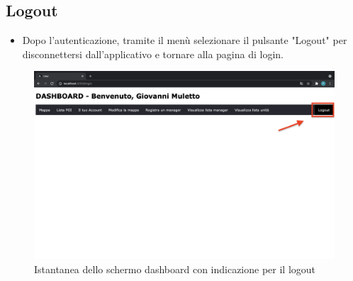 \subsection{Logout}
\begin{itemize}
    \item Dopo l'autenticazione, tramite il menù selezionare il pulsante "Logout" per disconnettersi dall'applicativo e tornare alla pagina di login.
    
\end{itemize}
\begin{figure}[H]
    \centering
    \includegraphics[scale=0.12]{res/images/logout.png}
    \caption{Istantanea dello schermo dashboard con indicazione per il logout}
\end{figure} 